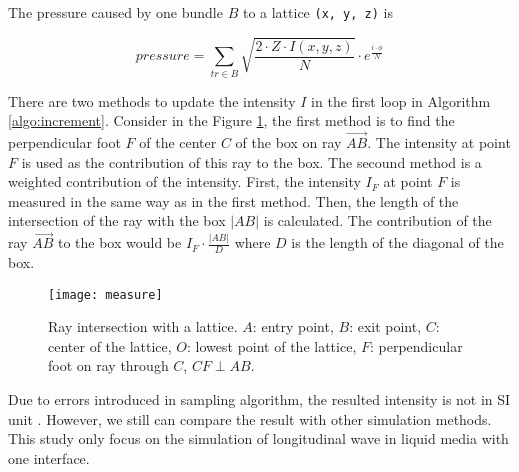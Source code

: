 The pressure caused by one bundle $B$ to a lattice \texttt{(x, y, z)} is

\begin{equation}
    pressure = \sum_{tr\in B} \sqrt{\frac{2\cdot Z\cdot I(x,y,z)}{N}} \cdot e^{\frac{i\cdot\phi}{N}}
\end{equation}

There are two methods to update the intensity $I$ in the first loop in Algorithm \ref{algo:increment}. Consider in the Figure \ref{fig:measure}, the first method is to find the perpendicular foot $F$ of the center $C$ of the box on ray $\vec{AB}$. The intensity at point $F$ is used as the contribution of this ray to the box. The secound method is a weighted contribution of the intensity. First, the intensity $I_F$ at point $F$ is measured in the same way as in the first method. Then, the length of the intersection of the ray with the box $|AB|$ is calculated. The contribution of the ray $\vec{AB}$ to the box would be $I_F \cdot \frac{|AB|}{D}$ where $D$ is the length of the diagonal of the box.

\begin{figure}[h]
    \centering
    \texttt{[image: measure]}
    \caption{Ray intersection with a lattice. $A$: entry point, $B$: exit point, $C$: center of the lattice, $O$: lowest point of the lattice, $F$: perpendicular foot on ray through $C$, $CF \perp AB$.}
    \label{fig:measure}
\end{figure}

Due to errors introduced in sampling algorithm, the resulted intensity is not in SI unit \cite{unitscale}. However, we still can compare the result with other simulation methods. This study only focus on the simulation of longitudinal wave in liquid media with one interface.



